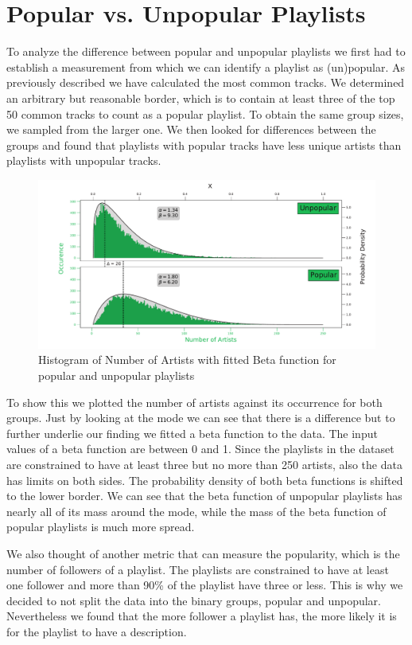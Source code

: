 \section{Popular vs. Unpopular Playlists}
To analyze the difference between popular and unpopular playlists we first had to establish a measurement from which we can identify a playlist as (un)popular. As previously described we have calculated the most common tracks. We determined an arbitrary but reasonable border, which is to contain at least three of the top 50 common tracks to count as a popular playlist. To obtain the same group sizes, we sampled from the larger one. We then looked for differences between the groups and found that playlists with popular tracks have less unique artists than playlists with unpopular tracks. 

\begin{figure}[ht]
    \centering
    \includegraphics[width=\textwidth]{doc/fig/pop_unpop_artist.pdf}
    \caption{Histogram of Number of Artists with fitted Beta function for popular and unpopular playlists}
    \label{fig:averagetrack}
\end{figure}

To show this we plotted the number of artists against its occurrence for both groups. Just by looking at the mode we can see that there is a difference but to further underlie our finding we fitted a beta function to the data. The input values of a beta function are between 0 and 1. Since the playlists in the dataset are constrained to have at least three but no more than 250 artists, also the data has limits on both sides. The probability density of both beta functions is shifted to the lower border. We can see that the beta function of unpopular playlists has nearly all of its mass around the mode, while the mass of the beta function of popular playlists is much more spread.

We also thought of another metric that can measure the popularity, which is the number of followers of a playlist. The playlists are constrained to have at least one follower and more than 90\% of the playlist have three or less. This is why we decided to not split the data into the binary groups, popular and unpopular. Nevertheless we found that the more follower a playlist has, the more likely it is for the playlist to have a description.

